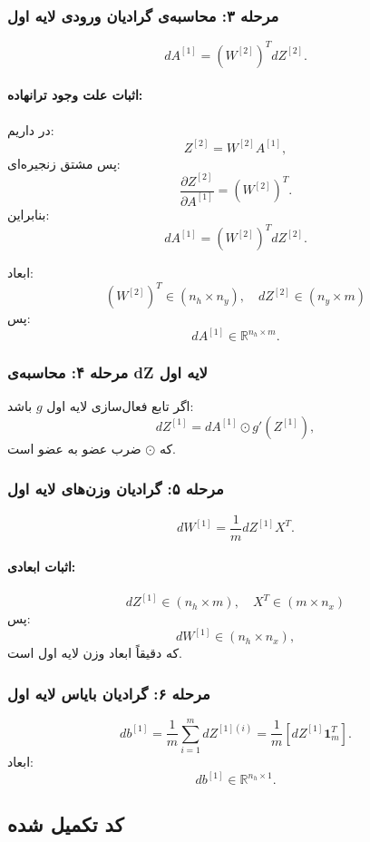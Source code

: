 \documentclass{article}
\begin{document}
\subsubsection*{مرحله ۳: محاسبه‌ی گرادیان ورودی لایه اول}
\[
dA^{[1]} = (W^{[2]})^T dZ^{[2]}.
\]

\paragraph{اثبات علت وجود ترانهاده:}
در  داریم:
\[
Z^{[2]} = W^{[2]} A^{[1]},
\]
پس مشتق زنجیره‌ای:
\[
\frac{\partial Z^{[2]}}{\partial A^{[1]}} = (W^{[2]})^T.
\]
بنابراین:
\[
dA^{[1]} = (W^{[2]})^T dZ^{[2]}.
\]

ابعاد:
\[
(W^{[2]})^T \in (n_h \times n_y), \quad
dZ^{[2]} \in (n_y \times m)
\]
پس:
\[
dA^{[1]} \in \mathbb{R}^{n_h \times m}.
\]

\subsubsection*{مرحله ۴: محاسبه‌ی dZ لایه اول}
اگر تابع فعال‌سازی لایه اول \( g \) باشد:
\[
dZ^{[1]} = dA^{[1]} \odot g'(Z^{[1]}),
\]
که \(\odot\) ضرب عضو به عضو است.

\subsubsection*{مرحله ۵: گرادیان وزن‌های لایه اول}
\[
dW^{[1]} = \frac{1}{m} dZ^{[1]} X^T.
\]

\paragraph{اثبات ابعادی:}
\[
dZ^{[1]} \in (n_h \times m), \quad X^T \in (m \times n_x)
\]
پس:
\[
dW^{[1]} \in (n_h \times n_x),
\]
که دقیقاً ابعاد وزن لایه اول است.

\subsubsection*{مرحله ۶: گرادیان بایاس لایه اول}
\[
db^{[1]} = \frac{1}{m} \sum_{i=1}^{m} dZ^{[1](i)}
= \frac{1}{m} \left[ dZ^{[1]} \mathbf{1}_m^T \right].
\]
ابعاد:
\[
db^{[1]} \in \mathbb{R}^{n_h \times 1}.
\]



\subsection{کد تکمیل شده}
\end{document}
